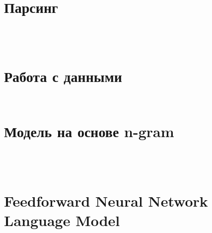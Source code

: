 \documentclass[coursework]{SCWorks}
\begin{document}
    \newpage


    \nocite{*}

    
    

    \appendix


    \section{Парсинг}
    \inputminted{py}{/Users/veronika_steklo/PycharmProjects/generation_names/parsing/parsing_proza_ru.py}
    \inputminted{py}{/Users/veronika_steklo/PycharmProjects/generation_names/parsing/parsing_briefly.py}
    \inputminted{py}{/Users/veronika_steklo/PycharmProjects/generation_names/parsing/parsing_litprichal.py}
    \inputminted{py}{/Users/veronika_steklo/PycharmProjects/generation_names/parsing/parsing_litres.py}


    \section{Работа с данными}
    \inputminted{py}{code/work_with_all_data.py}
    \inputminted{py}{code/augmentation.py}


    \section{Модель на основе n-gram}
    \inputminted{py}{/Users/veronika_steklo/PycharmProjects/generation_names/my_models/history/n_gram/n_gram_model.py}
    \inputminted{py}{/Users/veronika_steklo/PycharmProjects/generation_names/my_models/history/n_gram/n-gram_train.py}
    \inputminted{py}{/Users/veronika_steklo/PycharmProjects/generation_names/my_models/history/n_gram/n-gram_test.py}
    \inputminted{py}{/Users/veronika_steklo/PycharmProjects/generation_names/my_models/history/n_gram/evaluate_ngram.py}


    \section{Feedforward Neural Network Language Model}
    \inputminted{py}{/Users/veronika_steklo/PycharmProjects/generation_names/my_models/history/FNNLM/data/dataset.py}
    \inputminted{py}{/Users/veronika_steklo/PycharmProjects/generation_names/my_models/history/FNNLM/model/model.py}
    \inputminted{py}{/Users/veronika_steklo/PycharmProjects/generation_names/my_models/history/FNNLM/model/utils.py}
    \inputminted{py}{/Users/veronika_steklo/PycharmProjects/generation_names/my_models/history/FNNLM/config.py}
    \inputminted{py}{/Users/veronika_steklo/PycharmProjects/generation_names/my_models/history/FNNLM/FNNLM_main.py}
    \inputminted{py}{/Users/veronika_steklo/PycharmProjects/generation_names/my_models/history/FNNLM/FNNLM_test.py}
    \inputminted{py}{/Users/veronika_steklo/PycharmProjects/generation_names/my_models/history/FNNLM/evaluate_fnnlm.py}
\end{document}
